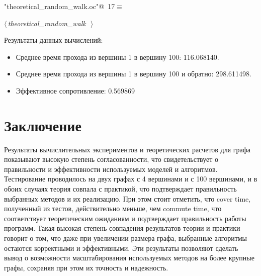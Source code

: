 \documentclass{article}
\begin{document}
\begin{flushleft} \small
\begin{minipage}{\linewidth}\label{scrap21}\raggedright\small
{} \verb@"theoretical_random_walk.oc"@\nobreak\ {\footnotesize {17}}$\equiv$
\vspace{-1ex}
\begin{list}{}{} \item
\mbox{}\verb@@\hbox{$\langle\,${\itshape theoretical_random_walk}\nobreak\ {\footnotesize {}}$\,\rangle$}\verb@@{\NWsep}
\end{list}
\vspace{-1.5ex}
\footnotesize
\begin{list}{}{\setlength{\itemsep}{-\parsep}\setlength{\itemindent}{-\leftmargin}}

\item{}
\end{list}
\end{minipage}\vspace{4ex}
\end{flushleft}
Результаты данных вычислений:
 \begin{itemize}
    \item Среднее время прохода из вершины 1 в вершину 100: 116.068140.
    \item Среднее время прохода из вершины 1 в вершину 100 и обратно: 298.611498.
    \item Эффективное сопротивление: 0.569869
\end{itemize}


\newpage
\section{Заключение}

Результаты вычислительных экспериментов и теоретических расчетов для графа показывают высокую степень согласованности, что свидетельствует о правильности и эффективности используемых моделей и алгоритмов. Тестирование проводилось на двух графах с 4 вершинами и с 100 вершинами, и в обоих случаях теория совпала с практикой, что подтверждает правильность выбранных методов и их реализацию. При этом стоит отметить, что cover time, полученный из тестов, действительно меньше, чем commute time, что соответствует теоретическим ожиданиям и подтверждает правильность работы программ. Такая высокая степень совпадения результатов теории и практики говорит о том, что даже при увеличении размера графа, выбранные алгоритмы остаются корректными и эффективными. Эти результаты позволяют сделать вывод о возможности масштабирования используемых методов на более крупные графы, сохраняя при этом их точность и надежность.
\newpage

\newpage
{}

\printbibliography
\end{document}
